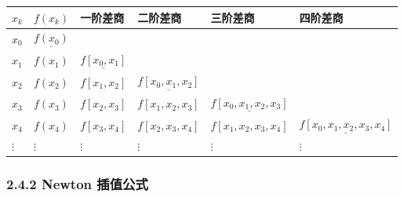 \documentclass[
  10pt,
  fontset=fandol]{ctexart}
\newcounter{none} %
\begin{document}
{\def\LTcaptype{none} %
\begin{longtable}[]{@{}
  >{\raggedright\arraybackslash}p{}
  >{\raggedright\arraybackslash}p{}
  >{\raggedright\arraybackslash}p{}
  >{\raggedright\arraybackslash}p{}
  >{\raggedright\arraybackslash}p{}
  >{\raggedright\arraybackslash}p{}@{}}
\toprule\noalign{}
\begin{minipage}[b]{\linewidth}\raggedright
\(x_k\)
\end{minipage} & \begin{minipage}[b]{\linewidth}\raggedright
\(f(x_k)\)
\end{minipage} & \begin{minipage}[b]{\linewidth}\raggedright
一阶差商
\end{minipage} & \begin{minipage}[b]{\linewidth}\raggedright
二阶差商
\end{minipage} & \begin{minipage}[b]{\linewidth}\raggedright
三阶差商
\end{minipage} & \begin{minipage}[b]{\linewidth}\raggedright
四阶差商
\end{minipage} \\
\midrule\noalign{}
\endhead
\bottomrule\noalign{}
\endlastfoot
\(x_0\) & \(\underline{f(x_0)}\) & & & & \\
\(x_1\) & \(f(x_1)\) & \(\underline{f[x_0,x_1]}\) & & & \\
\(x_2\) & \(f(x_2)\) & \(f[x_1,x_2]\) & \(\underline{f[x_0,x_1,x_2]}\) & & \\
\(x_3\) & \(f(x_3)\) & \(f[x_2,x_3]\) & \(f[x_1,x_2,x_3]\) & \(\underline{f[x_0,x_1,x_2,x_3]}\) & \\
\(x_4\) & \(f(x_4)\) & \(f[x_3,x_4]\) & \(f[x_2,x_3,x_4]\) & \(f[x_1,x_2,x_3,x_4]\) & \(\underline{f[x_0,x_1,x_2,x_3,x_4]}\) \\
\(\vdots\) & \(\vdots\) & \(\vdots\) & \(\vdots\) & \(\vdots\) & \(\vdots\) \\
\end{longtable}
}

\subsubsection{2.4.2 Newton 插值公式}\label{newton-ux63d2ux503cux516cux5f0f}
\end{document}
